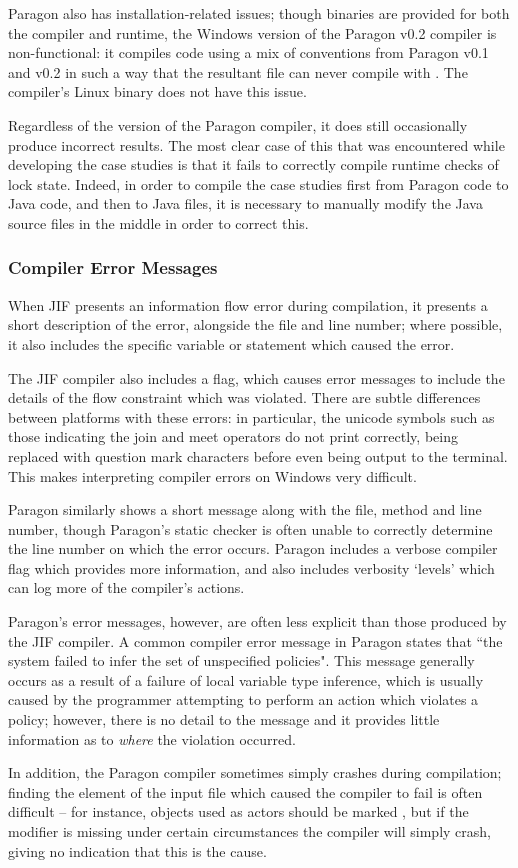 Paragon also has installation-related issues; though binaries are provided for both the compiler and runtime, the Windows version of the Paragon v0.2 compiler is non-functional: it compiles code using a mix of conventions from Paragon v0.1 and v0.2 in such a way that the resultant  file can never compile with . The compiler's Linux binary does not have this issue.

Regardless of the version of the Paragon compiler, it does still occasionally produce incorrect results. The most clear case of this that was encountered while developing the case studies is that it fails to correctly compile runtime checks of lock state. Indeed, in order to compile the case studies first from Paragon code to Java code, and then to Java  files, it is necessary to manually modify the Java source files in the middle in order to correct this.

\subsubsection{Compiler Error Messages}

When JIF presents an information flow error during compilation, it presents a short description of the error, alongside the file and line number; where possible, it also includes the specific variable or statement which caused the error.

The JIF compiler also includes a  flag, which causes error messages to include the details of the flow constraint which was violated. There are subtle differences between platforms with these errors: in particular, the unicode symbols such as those indicating the join and meet operators do not print correctly, being replaced with question mark characters before even being output to the terminal. This makes interpreting compiler errors on Windows very difficult.

Paragon similarly shows a short message along with the file, method and line number, though Paragon's static checker is often unable to correctly determine the line number on which the error occurs. Paragon includes a verbose compiler flag which provides more information, and also includes verbosity `levels' which can log more of the compiler's actions.

Paragon's error messages, however, are often less explicit than those produced by the JIF compiler. A common compiler error message in Paragon states that ``the system failed to infer the set of unspecified policies". This message generally occurs as a result of a failure of local variable type inference, which is usually caused by the programmer attempting to perform an action which violates a policy; however, there is no detail to the message and it provides little information as to \textit{where} the violation occurred.

In addition, the Paragon compiler sometimes simply crashes during compilation; finding the element of the input file which caused the compiler to fail is often difficult -- for instance, objects used as actors should be marked , but if the modifier is missing under certain circumstances the compiler will simply crash, giving no indication that this is the cause.